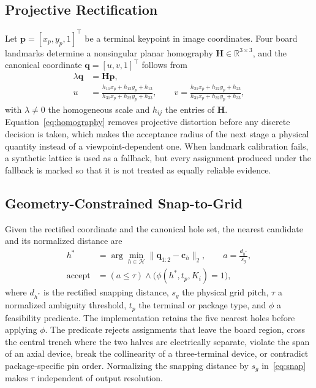 \documentclass[conference]{IEEEtran}
\begin{document}
\subsection{Projective Rectification}

Let $\mathbf{p}=[x_p,y_p,1]^\top$ be a terminal keypoint in image coordinates.
Four board landmarks determine a nonsingular planar homography
$\mathbf{H}\in\mathbb{R}^{3\times 3}$, and the canonical coordinate
$\mathbf{q}=[u,v,1]^\top$ follows from
\begin{equation}
\begin{split}
\lambda\mathbf{q} &= \mathbf{H}\mathbf{p},\\
u &= \frac{h_{11}x_p+h_{12}y_p+h_{13}}{h_{31}x_p+h_{32}y_p+h_{33}},\qquad
v = \frac{h_{21}x_p+h_{22}y_p+h_{23}}{h_{31}x_p+h_{32}y_p+h_{33}},
\end{split}
\label{eq:homography}
\end{equation}
with $\lambda\neq 0$ the homogeneous scale and $h_{ij}$ the entries of
$\mathbf{H}$. Equation~\eqref{eq:homography} removes projective distortion
before any discrete decision is taken, which makes the acceptance radius of the
next stage a physical quantity instead of a viewpoint-dependent one. When
landmark calibration fails, a synthetic lattice is used as a fallback, but every
assignment produced under the fallback is marked so that it is not treated as
equally reliable evidence.

\subsection{Geometry-Constrained Snap-to-Grid}

Given the rectified coordinate and the canonical hole set, the nearest candidate
and its normalized distance are
\begin{align}
h^{*} &= \arg\min_{h\in\mathcal{H}}
   \lVert \mathbf{q}_{1:2}-\mathbf{c}_h \rVert_2,
   \qquad a = \frac{d_{h^{*}}}{s_g},
\label{eq:snap}\\
\mathrm{accept} &= (a \le \tau) \wedge
   \bigl(\phi(h^{*},t_p,K_i)=1\bigr),
\label{eq:accept}
\end{align}
where $d_{h^{*}}$ is the rectified snapping distance, $s_g$ the physical grid
pitch, $\tau$ a normalized ambiguity threshold, $t_p$ the terminal or package
type, and $\phi$ a feasibility predicate. The implementation retains the five
nearest holes before applying $\phi$. The predicate rejects assignments that leave the
board region, cross the central trench where the two halves are electrically
separate, violate the span of an axial device, break the collinearity of a
three-terminal device, or contradict package-specific pin order. Normalizing the
snapping distance by $s_g$ in~\eqref{eq:snap} makes $\tau$ independent of output
resolution.
\end{document}
